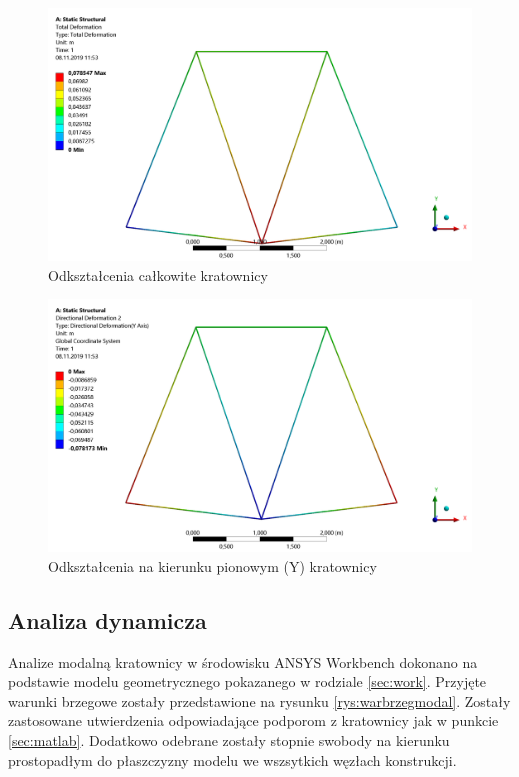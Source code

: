 \documentclass[12pt, a4papper, twoside]{article}
\begin{document}
\begin{figure}[H]
    \centering
    \includegraphics[width=\textwidth, height=0.55\textwidth]{StructuralTotalDef.png}
    \caption{Odkształcenia całkowite kratownicy}
    \label{rys:totaldef}
\end{figure}

\begin{figure}[H]
    \centering
    \includegraphics[width=\textwidth, height=0.55\textwidth]{StructuralYDef.png}
    \caption{Odkształcenia na kierunku pionowym (Y) kratownicy}
    \label{rys:ydef}
\end{figure}



\subsection{Analiza dynamicza}
\label{sec:ansys:dynamiczna}

Analize modalną kratownicy w środowisku ANSYS Workbench dokonano na podstawie modelu geometrycznego pokazanego w rodziale \ref{sec:work}. Przyjęte warunki brzegowe zostały przedstawione na rysunku  \ref{rys:warbrzegmodal}. Zostały zastosowane utwierdzenia odpowiadające podporom z kratownicy jak w punkcie \ref{sec:matlab}. Dodatkowo odebrane zostały stopnie swobody na kierunku prostopadłym do płaszczyzny modelu we wszsytkich węzłach konstrukcji.
\end{document}
